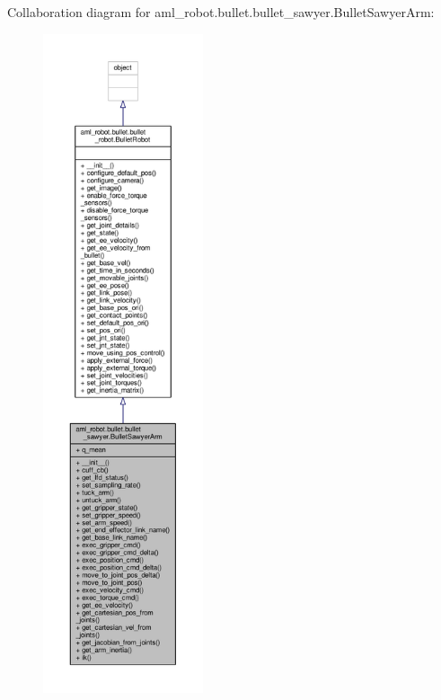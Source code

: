 Collaboration diagram for aml\-\_\-robot.\-bullet.\-bullet\-\_\-sawyer.\-Bullet\-Sawyer\-Arm\-:\nopagebreak
\begin{figure}[H]
\begin{center}
\leavevmode
\includegraphics[height=550pt]{classaml__robot_1_1bullet_1_1bullet__sawyer_1_1_bullet_sawyer_arm__coll__graph}
\end{center}
\end{figure}
